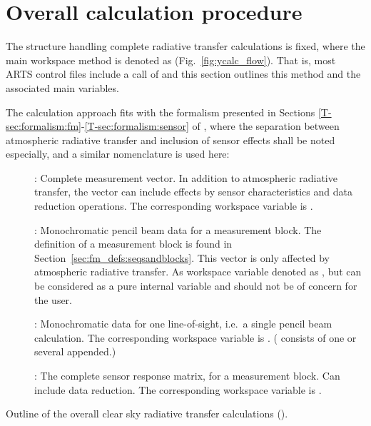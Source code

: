 \section{Overall calculation procedure}
\label{sec:fm_defs:calcproc}

The structure handling complete radiative transfer calculations is fixed, where
the main workspace method is denoted as 
(Fig.~\ref{fig:ycalc_flow}). That is, most ARTS control files include a call of
 and this section outlines this method and the associated
main variables.

The calculation approach fits with the formalism presented in Sections
\ref{T-sec:formalism:fm}-\ref{T-sec:formalism:sensor} of \theory, where the
separation between atmospheric radiative transfer and inclusion of sensor
effects shall be noted especially, and a similar nomenclature is used here:
\begin{description}
\item[\MsrVct]: Complete measurement vector. In addition to atmospheric
  radiative transfer, the vector can include effects by sensor characteristics
  and data reduction operations. The corresponding workspace variable is 
  .
\item[]: Monochromatic pencil beam data for a measurement block. The
  definition of a measurement block is found in
  Section~\ref{sec:fm_defs:seqsandblocks}. This vector is only affected by
  atmospheric radiative transfer. As workspace variable denoted as
  , but can be considered as a pure internal variable and should
  not be of concern for the user.
\item[]: Monochromatic data for one line-of-sight, i.e.\ a single
  pencil beam calculation. The corresponding workspace variable is
  . ( consists of one or several  appended.)
\item[]: The complete sensor response matrix, for a measurement
  block. Can include data reduction. The corresponding workspace variable is
  .
\end{description}
\begin{algorithm}[t]
 \begin{algorithmic}
   \ENDFOR
  \ENDFOR
 \end{algorithmic}
 \caption{Outline of the overall clear sky radiative transfer calculations
   ().}
 \label{alg:fm_defs:yCalc}
\end{algorithm}
